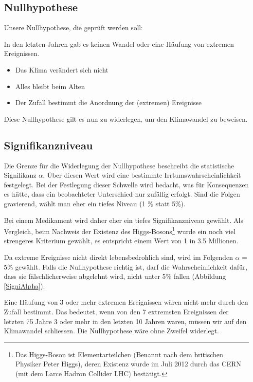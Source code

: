 \begin{refsection}
\subsection{Nullhypothese}
Unsere Nullhypothese, die geprüft werden soll:

In den letzten Jahren gab es keinen Wandel oder eine Häufung von extremen Ereignissen.
\begin{itemize}
\item Das Klima verändert sich nicht
\item Alles bleibt beim Alten
\item Der Zufall bestimmt die Anordnung der (extremen) Ereignisse
\end{itemize}
%
Diese Nullhypothese gilt es nun zu widerlegen, um den Klimawandel zu beweisen.


\subsection{Signifikanzniveau}
Die Grenze für die Widerlegung der Nullhypothese beschreibt die statistische Signifikanz $\alpha$. Über diesen Wert wird eine bestimmte Irrtumswahrscheinlichkeit festgelegt.
Bei der Festlegung dieser Schwelle wird bedacht, was für Konsequenzen es hätte, dass ein beobachteter Unterschied nur zufällig erfolgt. Sind die Folgen gravierend, wählt man eher ein tiefes Niveau (1 \% statt 5\%).

Bei einem Medikament wird daher eher ein tiefes Signifikanzniveau gewählt. Als Vergleich, beim Nachweis der Existenz des Higgs-Bosons\footnote{%
Das Higgs-Boson ist Elementarteilchen (Benannt nach dem britischen Physiker Peter Higgs), deren Existenz wurde im Juli 2012 durch das CERN (mit dem Larce Hadron Collider LHC) bestätigt.} wurde ein noch viel strengeres Kriterium gewählt, es entspricht einem Wert von 1 in 3.5 Millionen. 

Da extreme Ereignisse nicht direkt lebensbedrohlich sind, wird im Folgenden $\alpha$ = 5\% gewählt.
Falls die Nullhypothese richtig ist, darf die Wahrscheinlichkeit dafür, dass sie fälschlicherweise abgelehnt wird, nicht unter 5\% fallen (Abbildung \ref{SigniAlpha}).


Eine Häufung von 3 oder mehr extremen Ereignissen wären nicht mehr durch den Zufall bestimmt. Das bedeutet, wenn von den 7 extremsten Ereignissen der letzten 75 Jahre 3 oder mehr in den letzten 10 Jahren waren, müssen wir auf den Klimawandel schliessen. Die Nullhypothese wäre ohne Zweifel widerlegt.


\end{refsection}

